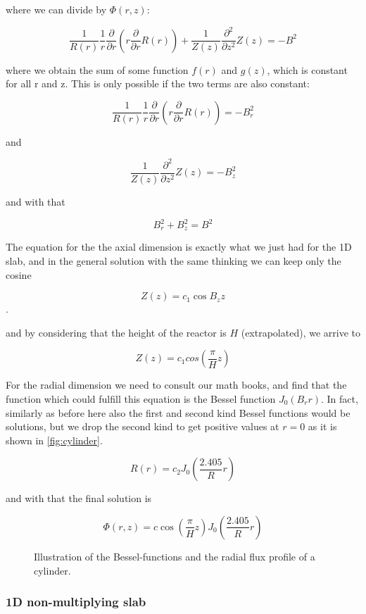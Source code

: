 \noindent where we can divide by $\Phi(r,z)$:

\[
\frac{1}{R(r)}\frac{1}{r}\frac{\partial}{\partial r}(r\frac{\partial}{\partial r}R(r))+\frac{1}{Z(z)}\frac{\partial^2}{\partial z^2}Z(z)=-B^2
\]

\noindent where we obtain the sum of some function $f(r)$ and $g(z)$, which is constant for all r and z. This is only possible if the two terms are also constant:


\[
\frac{1}{R(r)}\frac{1}{r}\frac{\partial}{\partial r}(r\frac{\partial}{\partial r}R(r))=-B_r^2
\]

\noindent and

\[
\frac{1}{Z(z)}\frac{\partial^2}{\partial z^2}Z(z)=-B_z^2
\]

\noindent and with that

\[
B_r^2+B_z^2=B^2
\]

The equation for the the axial dimension is exactly what we just had for the 1D slab, and in the general solution with the same thinking we can keep only the cosine 

\[
Z(z)=c_1\cos B_zz
\].  

\noindent and by considering that the height of the reactor is $H$ (extrapolated), we arrive to

\[
Z(z)=c_1cos(\frac{\pi}{H}z)
\]

For the radial dimension we need to consult our math books, and find that the function which could fulfill this equation is the Bessel function $J_0(B_rr)$. In fact, similarly as before here also the first and second kind Bessel functions would be solutions, but we drop the second kind to get positive values at $r=0$ as it is shown in \autoref{fig:cylinder}.

\[
R(r)=c_2J_0(\frac{2.405}{R}r)
\]

\noindent and with that the final solution is

\[
\Phi(r,z)=c\cos(\frac{\pi}{H}z)J_0(\frac{2.405}{R}r)
\]

\begin{figure}[ht!]
\protect {}\protect
\caption{\label{fig:cylinder} \footnotesize{Illustration of the Bessel-functions and the radial flux profile of a cylinder.}}
\end{figure} 

\subsubsection*{1D non-multiplying slab}

